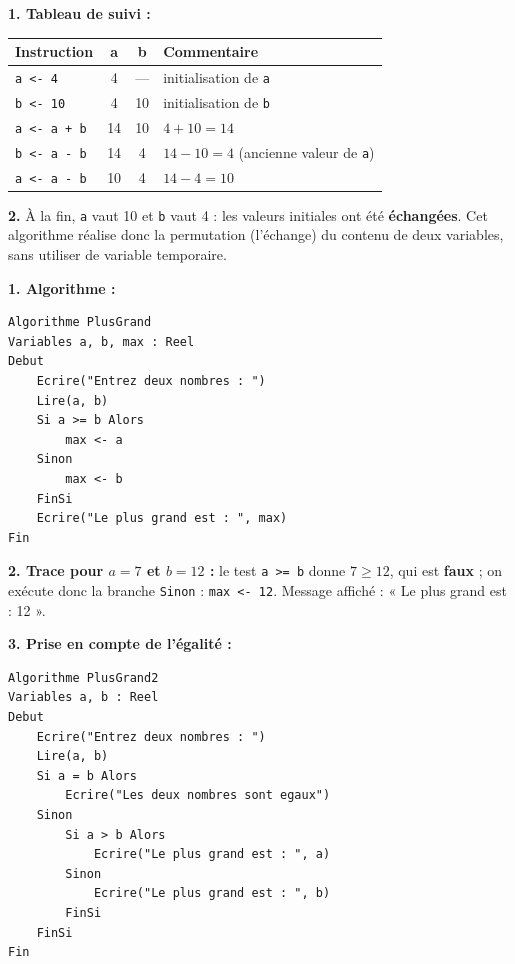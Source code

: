 \documentclass[11pt]{article}
\newcommand{\cle}[1]{{\popxbold\color{popdark}#1}}
\begin{document}
\begin{corrige}
\textbf{1. Tableau de suivi :}
\begin{center}
\begin{tabularx}{\linewidth}{|l|c|c|X|}
\hline
\rowcolor{popblueL} \textbf{Instruction} & \textbf{a} & \textbf{b} & \textbf{Commentaire} \\
\hline
\texttt{a <- 4} & 4 & --- & initialisation de \texttt{a} \\
\hline
\texttt{b <- 10} & 4 & 10 & initialisation de \texttt{b} \\
\hline
\texttt{a <- a + b} & 14 & 10 & $4 + 10 = 14$ \\
\hline
\texttt{b <- a - b} & 14 & 4 & $14 - 10 = 4$ (ancienne valeur de \texttt{a}) \\
\hline
\texttt{a <- a - b} & 10 & 4 & $14 - 4 = 10$ \\
\hline
\end{tabularx}
\end{center}

\textbf{2.} À la fin, \texttt{a} vaut 10 et \texttt{b} vaut 4 : les valeurs initiales ont été \textbf{échangées}. Cet algorithme réalise donc la \cle{permutation} (l'échange) du contenu de deux variables, sans utiliser de variable temporaire.
\end{corrige}

\begin{corrige}
\textbf{1. Algorithme :}
\begin{lstlisting}
Algorithme PlusGrand
Variables a, b, max : Reel
Debut
    Ecrire("Entrez deux nombres : ")
    Lire(a, b)
    Si a >= b Alors
        max <- a
    Sinon
        max <- b
    FinSi
    Ecrire("Le plus grand est : ", max)
Fin
\end{lstlisting}

\textbf{2. Trace pour $a = 7$ et $b = 12$ :} le test \texttt{a >= b} donne $7 \ge 12$, qui est \textbf{faux} ; on exécute donc la branche \texttt{Sinon} : \texttt{max <- 12}. Message affiché : « Le plus grand est : 12 ».

\textbf{3. Prise en compte de l'égalité :}
\begin{lstlisting}
Algorithme PlusGrand2
Variables a, b : Reel
Debut
    Ecrire("Entrez deux nombres : ")
    Lire(a, b)
    Si a = b Alors
        Ecrire("Les deux nombres sont egaux")
    Sinon
        Si a > b Alors
            Ecrire("Le plus grand est : ", a)
        Sinon
            Ecrire("Le plus grand est : ", b)
        FinSi
    FinSi
Fin
\end{lstlisting}
\end{corrige}
\end{document}
